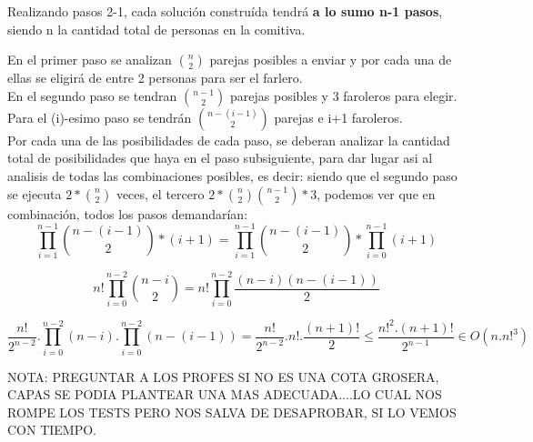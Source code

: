 \vspace*{1em}

Realizando pasos 2-1, cada solución construída tendrá {\bf a lo sumo n-1 pasos}, siendo n la cantidad total de personas en la comitiva.

En el primer paso se analizan $\binom {n}{2}$ parejas posibles a enviar y por cada una de ellas se eligirá de entre 2 personas para ser el farlero.\\

En el segundo paso se tendran $\binom {n-1}{2}$ parejas posibles y 3 faroleros para elegir.\\

Para el (i)-esimo paso se tendrán $\binom {n-(i-1)}{2}$ parejas e i+1 faroleros.\\

Por cada una de las posibilidades de cada paso, se deberan analizar la cantidad total de
posibilidades que haya en el paso subsiguiente, para dar lugar asi al analisis de todas las combinaciones posibles, es decir: siendo que el segundo paso se ejecuta $2 \ast \binom {n}{2}$ veces, el tercero $2 \ast \binom {n}{2} \binom{n-1} {2} \ast 3$, podemos ver que en combinación, todos los pasos demandarían:
\[
\prod_{i=1}^{n-1}\binom {n-(i-1)}{2}*(i+1) = \prod_{i=1}^{n-1}\binom {n-(i-1)}{2} * \prod_{i=0}^{n-1}(i+1)
\]

\[
n!\prod_{i=0}^{n-2}\binom {n-i}{2} = n!\prod_{i=0}^{n-2}\frac{(n-i)(n-(i-1))}{2}
\]

\[
\frac{ n!}{2^{n-2}}.\prod_{i=0}^{n-2}(n-i).\prod_{i=0}^{n-2}(n-(i-1)) = \frac{n!}{2^{n-2}}.n!.\frac{(n+1)!}{2}\leq \frac{n!^{2}.(n+1)!}{2^{n-1}}\in O(n.n!^{3})
\]

NOTA: PREGUNTAR A LOS PROFES SI NO ES UNA COTA GROSERA, CAPAS SE PODIA PLANTEAR UNA MAS ADECUADA....LO CUAL NOS ROMPE LOS TESTS PERO NOS SALVA DE DESAPROBAR, SI LO VEMOS CON TIEMPO.